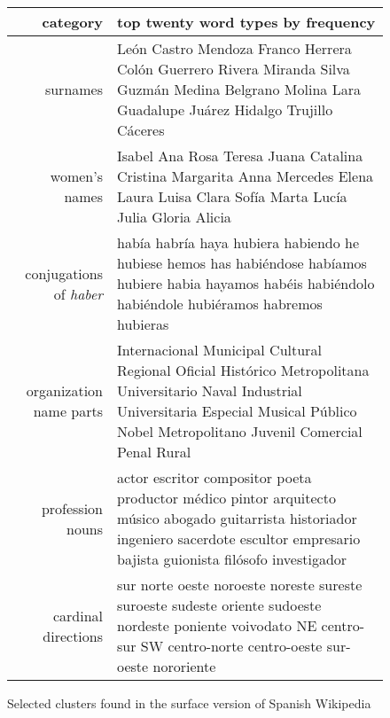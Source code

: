 \begin{figure*}[t!]
  \begin{tabular}{|r|p{10cm}|}
    \hline
    category  & top twenty word types by frequency \\
    \hline
    surnames & León Castro Mendoza Franco Herrera Colón Guerrero Rivera Miranda
    Silva Guzmán Medina Belgrano Molina Lara Guadalupe Juárez Hidalgo Trujillo
    Cáceres \\
    \hline
    women's names & Isabel Ana Rosa Teresa Juana Catalina Cristina Margarita
    Anna Mercedes Elena Laura Luisa Clara Sofía Marta Lucía Julia Gloria Alicia
    \\
    \hline
    conjugations of \emph{haber} & había habría haya hubiera habiendo he
    hubiese hemos has habiéndose habíamos hubiere habia hayamos habéis
    habiéndolo habiéndole hubiéramos habremos hubieras \\
    \hline
    organization name parts & Internacional Municipal Cultural Regional
    Oficial Histórico Metropolitana Universitario Naval Industrial
    Universitaria Especial Musical Público Nobel Metropolitano Juvenil
    Comercial Penal Rural \\
    \hline
    profession nouns & actor escritor compositor poeta productor médico pintor
    arquitecto músico abogado guitarrista historiador ingeniero sacerdote
    escultor empresario bajista guionista filósofo investigador \\
    \hline
    cardinal directions & sur norte oeste noroeste noreste sureste suroeste
    sudeste oriente sudoeste nordeste poniente voivodato NE centro-sur SW
    centro-norte centro-oeste sur-oeste nororiente \\
    \hline
  \end{tabular}
\caption{Selected clusters found in the surface version of Spanish Wikipedia}
\label{fig:clusters-wikipedia-surface}
\end{figure*}

